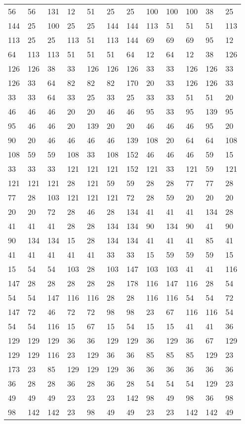 \begin{longtable}{llllllllllll}
56 &56& 131 &12 &51& 25&25 &100& 100 &100 &38& 25\\
144 &25& 100 &25 &25& 144&144 &113& 51 &51 &51& 113\\
113 &25& 25 &113 &51& 113&144 &69& 69 &69 &95& 12\\
64 &113& 113 &51 &51& 51&64 &12& 64 &12 &38& 126\\
126 &126& 38 &33 &126& 126&126 &33& 33 &126 &126& 33\\
126 &33& 64 &82 &82& 82&170 &20& 33 &126 &126& 33\\
33 &33& 64 &33 &25& 33&25 &33& 33 &51 &51& 20\\
46 &46& 46 &20 &20& 46&46 &95& 33 &95 &139& 95\\
95 &46& 46 &20 &139& 20&20 &46& 46 &46 &95& 20\\
90 &20& 46 &46 &46& 46&139 &108& 20 &64 &64& 108\\
108 &59& 59 &108 &33& 108&152 &46& 46 &46 &59& 15\\
33 &33& 33 &121 &121& 121&152 &121& 33 &121 &59& 121\\
121 &121& 121 &28 &121& 59&59 &28& 28 &77 &77& 28\\
77 &28& 103 &121 &121& 121&72 &28& 59 &20 &20& 20\\
20 &20& 72 &28 &46& 28&134 &41& 41 &41 &134& 28\\
41 &41& 41 &28 &28& 134&134 &90& 134 &90 &41& 90\\
90 &134& 134 &15 &28& 134&134 &41& 41 &41 &85& 41\\
41 &41& 41 &41 &41& 33&33 &15& 59 &59 &59& 15\\
15 &54& 54 &103 &28& 103&147 &103& 103 &41 &41& 116\\
147 &28& 28 &28 &28& 28&178 &116& 147 &116 &28& 54\\
54 &54& 147 &116 &116& 28&28 &116& 116 &54 &54& 72\\
147 &72& 46 &72 &72& 98&98 &23& 67 &116 &116& 54\\
54 &54& 116 &15 &67& 15&54 &15& 15 &41 &41& 36\\
129 &129& 129 &36 &36& 129&129 &36& 129 &36 &67& 129\\
129 &129& 116 &23 &129& 36&36 &85& 85 &85 &129& 23\\
173 &23& 85 &129 &129& 129&36 &36& 36 &36 &36& 36\\
36 &28& 28 &36 &28& 36&28 &54& 54 &54 &129& 23\\
49 &49& 49 &23 &23& 23&142 &98& 49 &98 &36& 98\\
98 &142& 142 &23 &98& 49&49 &23& 23 &142 &142& 49\\

\end{longtable}
